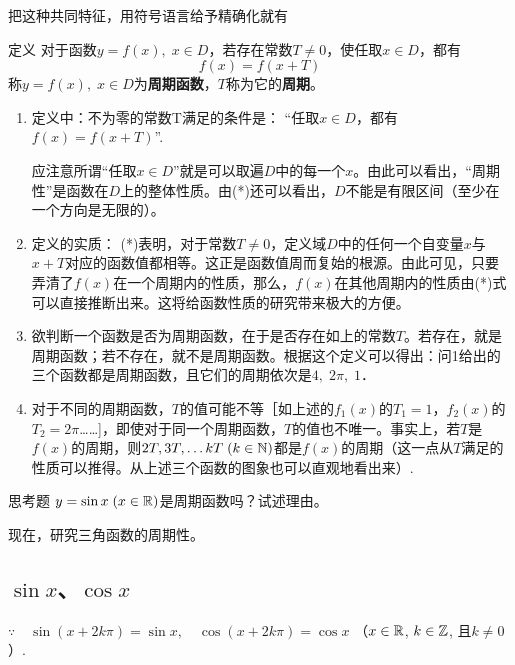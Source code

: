 把这种共同特征，用符号语言给予精确化就有

\begin{thm}
 {定义} 对于函数$y=f(x),\; x\in D$，若存在常数$T\ne 0$，使任取$x\in D$，都有
\begin{equation}
     f(x)=f(x+T)\tag{*}
\end{equation}
称$y=f(x),\; x\in D$为\textbf{周期函数}，$T$称为它的\textbf{周期}。   
\end{thm}

\begin{note}
\begin{enumerate}
    \item 定义中：不为零的常数T满足的条件是：
“任取$x\in D$，都有$f(x)=f(x+T)$”.

应注意所谓“任取$x\in D$”就是可以取遍$D$中的每一个$x$。由此可以看出，“周期性”是函数在$D$上的整体性质。由(*)还可以看出，$D$不能是有限区间（至少在一个方向是无限的）。
\item 定义的实质：
(*)表明，对于常数$T\ne 0$，定义域$D$中的任何一个自变量$x$与$x+T$对应的函数值都相等。这正是函数值周而复始的根源。由此可见，只要弄清了$f(x)$在一个周期内的性质，那么，$f(x)$在其他周期内的性质由(*)式可以直接推断出来。这将给函数性质的研究带来极大的方便。
\item 欲判断一个函数是否为周期函数，在于是否存在如上的常数$T$。若存在，就是周期函数；若不存在，就不是周期函数。根据这个定义可以得出：问1给出的三个函数都是周期函数，且它们的周期依次是$4,\; 2\pi,\;1$．
\item 对于不同的周期函数，$T$的值可能不等［如上述的$f_1(x)$的$T_1=1$，$f_2(x)$的$T_2=2\pi$……]，即使对于同一个周期函数，$T$的值也不唯一。事实上，若$T$是$f(x)$的周期，则$2T,3T,\ldots kT\; (k\in\mathbb{N})$都是$f(x)$的周期（这一点从$T$满足的性质可以推得。从上述三个函数的图象也可以直观地看出来）.
\end{enumerate}
\end{note}

\begin{thm}
    {思考题}  $y=\sin x\; (x\in\mathbb{R})$是周期函数吗？试述理由。
\end{thm}

现在，研究三角函数的周期性。

\subsection{$\sin x$、$\cos x$}

$\because\quad \sin ( x+ 2k\pi ) = \sin x, \quad \cos(x+2k\pi)=\cos x$ 
（$x\in \mathbb{R}$, \; $k\in \mathbb{Z}$, 且$k\neq 0$）.

